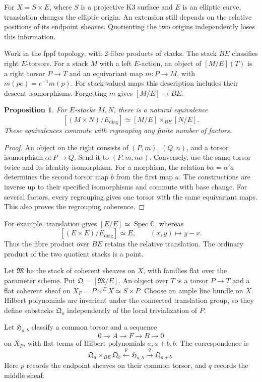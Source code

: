 \documentclass[11pt]{article}
\newtheorem{proposition}[theorem]{Proposition}
\begin{document}
For $X=S\times E$, where $S$ is a projective K3 surface and $E$
is an elliptic curve, translation changes the elliptic origin.
An extension still depends on the relative positions of its endpoint
sheaves. Quotienting the two origins independently loses this information.

Work in the fppf topology, with 2-fibre products of stacks.
The stack $BE$ classifies right $E$-torsors.
For a stack $M$ with a left $E$-action, an object of $[M/E](T)$
is a right torsor $P\to T$ and an equivariant map $m:P\to M$,
with $m(pe)=e^{-1}m(p)$.
For stack-valued maps this description includes their descent
isomorphisms. Forgetting $m$ gives $[M/E]\to BE$.

\begin{proposition}\label{common-torsor}
For $E$-stacks $M,N$, there is a natural equivalence
\[
 [(M\times N)/E_{\mathrm{diag}}]
 \simeq [M/E]\times_{BE}[N/E].
\]
These equivalences commute with regrouping any finite number of factors.
\end{proposition}
\begin{proof}
An object on the right consists of $(P,m)$, $(Q,n)$, and a torsor
isomorphism $\alpha:P\to Q$. Send it to $(P,m,n\alpha)$.
Conversely, use the same torsor twice and its identity isomorphism.
For a morphism, the relation $b\alpha=\alpha'a$ determines the second
torsor map $b$ from the first map $a$.
The constructions are inverse up to their specified isomorphisms
and commute with base change.
For several factors, every regrouping gives one torsor with the same
equivariant maps. This also proves the regrouping coherence.
\end{proof}

For example, translation gives $[E/E]\simeq\operatorname{Spec}\mathbb C$,
whereas
\[
 [(E\times E)/E_{\mathrm{diag}}]\simeq E,\qquad
 (x,y)\longmapsto y-x.
\]
Thus the fibre product over $BE$ retains the relative translation.
The ordinary product of the two quotient stacks is a point.

Let $\mathfrak M$ be the stack of coherent sheaves on $X$, with families
flat over the parameter scheme. Put $\mathfrak Q=[\mathfrak M/E]$.
An object over $T$ is a torsor $P\to T$ and a flat coherent sheaf
on $X_P=P\times^E X\simeq S\times P$.
Choose an ample line bundle on $X$.
Hilbert polynomials are invariant under the connected translation group,
so they define substacks $\mathfrak Q_a$ independently of the local
trivialization of $P$.

Let $\mathfrak H_{a,b}$ classify a common torsor and a sequence
\[
 0\longrightarrow A\longrightarrow F\longrightarrow B
 \longrightarrow0
\]
on $X_P$, with flat terms of Hilbert polynomials $a,a+b,b$.
The correspondence is
\begin{equation}\label{relative-hallcorr}
 \mathfrak Q_a\times_{BE}\mathfrak Q_b
 \xleftarrow{\ p\ }\mathfrak H_{a,b}
 \xrightarrow{\ q\ }\mathfrak Q_{a+b}.
\end{equation}
Here $p$ records the endpoint sheaves on their common torsor, and $q$
records the middle sheaf.
\end{document}
